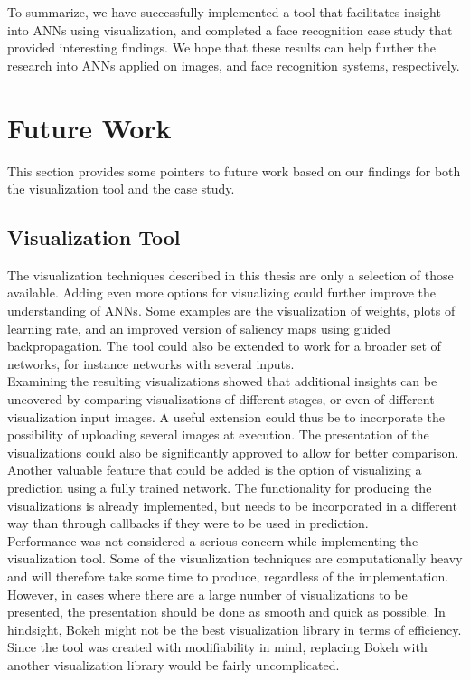 \noindent To summarize, we have successfully implemented a tool that facilitates insight into ANNs using visualization, and completed a face recognition case study that provided interesting findings. We hope that these results can help further the research into ANNs applied on images, and face recognition systems, respectively.

\section{Future Work}

This section provides some pointers to future work based on our findings for both the visualization tool and the case study.

\subsection{Visualization Tool}

The visualization techniques described in this thesis are only a selection of those available. Adding even more options for visualizing could further improve the understanding of ANNs. Some examples are the visualization of weights, plots of learning rate, and an improved version of saliency maps using guided backpropagation. The tool could also be extended to work for a broader set of networks, for instance networks with several inputs. \\

\noindent Examining the resulting visualizations showed that additional insights can be uncovered by comparing visualizations of different stages, or even of different visualization input images. A useful extension could thus be to incorporate the possibility of uploading several images at execution. The presentation of the visualizations could also be significantly approved to allow for better comparison. Another valuable feature that could be added is the option of visualizing a prediction using a fully trained network. The functionality for producing the visualizations is already implemented, but needs to be incorporated in a different way than through callbacks if they were to be used in prediction.\\

\noindent Performance was not considered a serious concern while implementing the visualization tool. Some of the visualization techniques are computationally heavy and will therefore take some time to produce, regardless of the implementation. However, in cases where there are a large number of visualizations to be presented, the presentation should be done as smooth and quick as possible. In hindsight, Bokeh might not be the best visualization library in terms of efficiency. Since the tool was created with modifiability in mind, replacing Bokeh with another visualization library would be fairly uncomplicated. 

